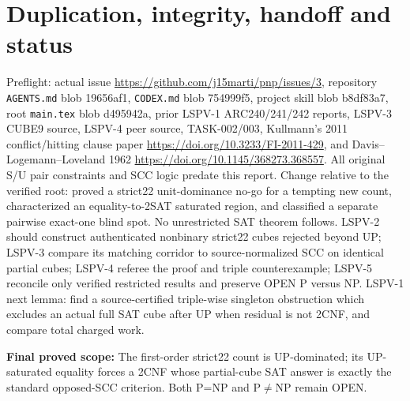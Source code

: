 \documentclass[10pt]{article}
\begin{document}
\section{Duplication, integrity, handoff and status}
Preflight: actual issue \url{https://github.com/j15marti/pnp/issues/3}, repository \texttt{AGENTS.md} blob 19656af1, \texttt{CODEX.md} blob 754999f5, project skill blob b8df83a7, root \texttt{main.tex} blob d495942a, prior LSPV-1 ARC240/241/242 reports, LSPV-3 CUBE9 source, LSPV-4 peer source, TASK-002/003, Kullmann's 2011 conflict/hitting clause paper \url{https://doi.org/10.3233/FI-2011-429}, and Davis--Logemann--Loveland 1962 \url{https://doi.org/10.1145/368273.368557}. All original S/U pair constraints and SCC logic predate this report. Change relative to the verified root: proved a strict22 unit-dominance no-go for a tempting new count, characterized an equality-to-2SAT saturated region, and classified a separate pairwise exact-one blind spot. No unrestricted SAT theorem follows.
LSPV-2 should construct authenticated nonbinary strict22 cubes rejected beyond UP; LSPV-3 compare its matching corridor to source-normalized SCC on identical partial cubes; LSPV-4 referee the proof and triple counterexample; LSPV-5 reconcile only verified restricted results and preserve OPEN P versus NP. LSPV-1 next lemma: find a source-certified triple-wise singleton obstruction which excludes an actual full SAT cube after UP when residual is not 2CNF, and compare total charged work.
\par\noindent\textbf{Final proved scope:} The first-order strict22 count is UP-dominated; its UP-saturated equality forces a 2CNF whose partial-cube SAT answer is exactly the standard opposed-SCC criterion. Both P=NP and P$\ne$NP remain OPEN.
\end{document}
